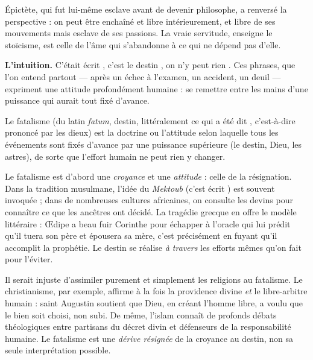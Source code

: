 \documentclass[11pt]{article}
\newcommand{\cle}[1]{{\popxbold\color{popdark}#1}}
\newcounter{popsec}
\newcounter{popsub}
\newcommand{\courssub}[1]{%
  \stepcounter{popsub}%
  \par\vspace{9pt}\noindent{\popxbold\fontsize{11.5}{13}\selectfont\color{popink}{\color{poporange}\thepopsec.\thepopsub}\hspace{6pt}#1}\par\nopagebreak\vspace{4pt}
}
\begin{document}
Épictète, qui fut lui-même esclave avant de devenir philosophe, a renversé la perspective : on peut être enchaîné et libre intérieurement, et libre de ses mouvements mais esclave de ses passions. La vraie servitude, enseigne le stoïcisme, est celle de l'âme qui s'abandonne à ce qui ne dépend pas d'elle.

\courssub{Le fatalisme : la croyance au destin}

\textbf{L'intuition.} \guillemotleft C'était écrit \guillemotright, \guillemotleft c'est le destin \guillemotright, \guillemotleft on n'y peut rien \guillemotright. Ces phrases, que l'on entend partout --- après un échec à l'examen, un accident, un deuil --- expriment une attitude profondément humaine : se remettre entre les mains d'une puissance qui aurait tout fixé d'avance.

\begin{definition}[Le fatalisme]
Le \cle{fatalisme} (du latin \emph{fatum}, destin, littéralement \guillemotleft ce qui a été dit \guillemotright, c'est-à-dire prononcé par les dieux) est la doctrine ou l'attitude selon laquelle tous les événements sont fixés d'avance par une puissance supérieure (le destin, Dieu, les astres), de sorte que l'effort humain ne peut rien y changer.
\end{definition}

Le fatalisme est d'abord une \emph{croyance} et une \emph{attitude} : celle de la résignation. Dans la tradition musulmane, l'idée du \emph{Mektoub} (\guillemotleft c'est écrit \guillemotright) est souvent invoquée ; dans de nombreuses cultures africaines, on consulte les devins pour connaître ce que les ancêtres ont décidé. La tragédie grecque en offre le modèle littéraire : Œdipe a beau fuir Corinthe pour échapper à l'oracle qui lui prédit qu'il tuera son père et épousera sa mère, c'est précisément en fuyant qu'il accomplit la prophétie. Le destin se réalise \emph{à travers} les efforts mêmes qu'on fait pour l'éviter.

\begin{attention}
Il serait injuste d'assimiler purement et simplement les religions au fatalisme. Le christianisme, par exemple, affirme à la fois la providence divine \emph{et} le libre-arbitre humain : saint Augustin soutient que Dieu, en créant l'homme libre, a voulu que le bien soit choisi, non subi. De même, l'islam connaît de profonds débats théologiques entre partisans du décret divin et défenseurs de la responsabilité humaine. Le fatalisme est une \emph{dérive résignée} de la croyance au destin, non sa seule interprétation possible.
\end{attention}
\end{document}
